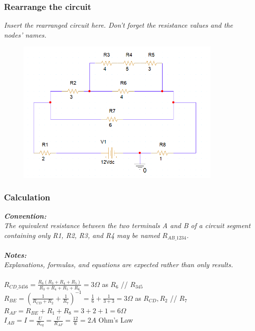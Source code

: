 \subsubsection{Rearrange the circuit}
\textit{Insert the rearranged circuit here. Don't forget the resistance values and the nodes' names.}
\begin{figure}[H]
    \centering
    \includegraphics[width = 10cm]{source/picture/bai_1/ex2.png}
    \label{lab1_ex2}
\end{figure}
\newpage

\subsubsection{Calculation}
\textit{\textbf{Convention:}}\\
\textit{The equivalent resistance between the two terminals A and B of a circuit segment containing only R1, R2, R3, and R4 may be named $R_{AB\_1234}$.}\\
\\
\textit{\textbf{Notes:}}\\
\textit{Explanations, formulas, and equations are expected rather than only results.}\\
\\
$R_{CD\_3456} = \frac{R_6(R_3+R_4+R_5)}{R_3+R_4+R_5+R_6}=3\Omega$  as $R_6$ // $R_{345}$\bigskip\\
$R_{BE} = (\frac{1}{R_{CD}+R_2}+\frac{1}{R_7})^{-1}= \frac{1}{6} +\frac{1}{3+3}=3\Omega$ as $R_{CD},R_2$ // $R_7$\bigskip\\
$R_{AF} = R_{BE} + R_1 + R_8 = 3+2+1=6\Omega$\bigskip\\
$I_{AB} = I = \frac{U}{R_{eq}} = \frac{U}{R_{AF}} = \frac{12}{6} = 2A$ Ohm's Law\bigskip\\

